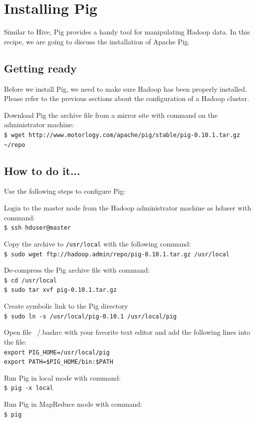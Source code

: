 \section{Installing Pig}
Similar to Hive, Pig provides a handy tool for manipulating Hadoop data. In this recipe, we are going to discuss the installation of Apache Pig.
\subsection*{Getting ready}
Before we install Pig, we need to make sure Hadoop has been properly installed. Please refer to the previous sections about the configuration of a Hadoop cluster.

Download Pig the archive file from a mirror site with command on the administrator machine: \\
\verb|$ wget http://www.motorlogy.com/apache/pig/stable/pig-0.10.1.tar.gz ~/repo|

\subsection*{How to do it...}
Use the following steps to configure Pig:

Login to the master node from the Hadoop administrator machine as hduser with command: \\
\verb|$ ssh hduser@master|

Copy the archive to \verb|/usr/local| with the following command: \\
\verb|$ sudo wget ftp://hadoop.admin/repo/pig-0.10.1.tar.gz /usr/local|

De-compress the Pig archive file with command:\\
\verb|$ cd /usr/local| \\
\verb|$ sudo tar xvf pig-0.10.1.tar.gz|

Create symbolic link to the Pig directory \\
\verb|$ sudo ln -s /usr/local/pig-0.10.1 /usr/local/pig|

Open file ~/.bashrc with your favorite text editor and add the following lines into the file: \\
\verb|export PIG_HOME=/usr/local/pig| \\
\verb|export PATH=$PIG_HOME/bin:$PATH|

Run Pig in local mode with command: \\
\verb|$ pig -x local|

Run Pig in MapReduce mode with command: \\
\verb|$ pig|

